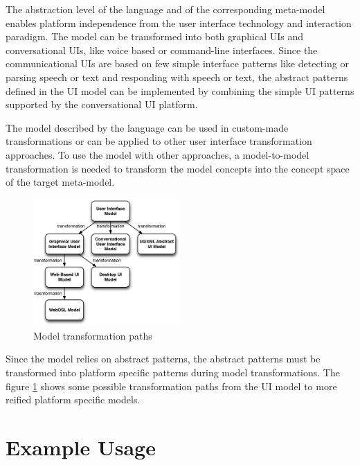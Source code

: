 \documentclass[conference]{IEEEtran}
\begin{document}
The abstraction level of the language and of the corresponding meta-model
enables platform independence from the user interface technology and
interaction paradigm. The model can be transformed into both graphical UIs and
conversational UIs, like voice based or command-line interfaces. Since the
communicational UIs are based on few simple interface patterns like detecting
or parsing speech or text and responding with speech or text, the abstract
patterns defined in the UI model can be implemented by combining the simple UI
patterns supported by the conversational UI platform.

The model described by the language can be used in custom-made transformations
or can be applied to other user interface transformation approaches. To use the
model with other approaches, a model-to-model transformation is needed to
transform the model concepts into the concept space of the target meta-model.

\begin{figure}
  \centering
    \includegraphics[width=0.5\textwidth]{transformations.eps}
      \caption{Model transformation paths}
      \label{fig:transformation_paths}
\end{figure}

Since the model relies on abstract patterns, the abstract patterns must be
transformed into platform specific patterns during model transformations. The
figure \ref{fig:transformation_paths} shows some possible transformation paths
from the UI model to more reified platform specific models.

\section{Example Usage}
\end{document}
